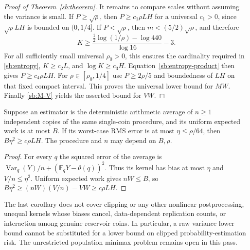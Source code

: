 \begin{proof}[Proof of Theorem~\ref{sb:theorem}]
It remains to compare scales without assuming the variance is small.
If $P\ge\sqrt\rho$, then $P\ge c_1\rho LH$ for a universal
$c_1>0$, since $\sqrt\rho LH$ is bounded on $(0,1/4]$.
If $P<\sqrt\rho$, then $m<(5/2)\sqrt\rho$, and therefore
\[
 K\ge\frac{\tfrac12\log(1/\rho)-\log440}{\log16}-3.
\]
For all sufficiently small universal $\rho_0>0$, this ensures the
cardinality required in \eqref{sb:entropy}, $K\ge c_2L$, and
$\log K\ge c_3H$. Equation~\eqref{sb:entropy-product} then gives
$P\ge c_4\rho LH$. For $\rho\in[\rho_0,1/4]$ use
$P\ge2\rho/5$ and boundedness of $LH$ on that fixed compact interval.
This proves the universal lower bound for $MW$. Finally
\eqref{sb:M-V} yields the asserted bound for $VW$.
\end{proof}

\begin{corollary}\label{sb:arithmetic-average}
Suppose an estimator is the deterministic arithmetic average of $n\ge1$
independent copies of the same single-coin procedure, and its uniform
expected work is at most $B$. If its worst-case RMS error is at most
$\eta\le\rho/64$, then $B\eta^2\ge c\rho LH$.
The procedure and $n$ may depend on $B,\rho$.
\end{corollary}
\begin{proof}
For every $q$ the squared error of the average is
$\operatorname{Var}_q(Y)/n+(\mathbb E_qY-\theta(q))^2$.
Thus its kernel has bias at most $\eta$ and $V/n\le\eta^2$.
Uniform expected work gives $nW\le B$, so
$B\eta^2\ge(nW)(V/n)=VW\ge c\rho LH$.
\end{proof}

The last corollary does not cover clipping or any other nonlinear
postprocessing, unequal kernels whose biases cancel, data-dependent
replication counts, or interaction among genuine reservoir coins.
In particular, a raw variance lower bound cannot be substituted for a
lower bound on clipped probability-estimation risk. The unrestricted
population minimax problem remains open in this pass.
